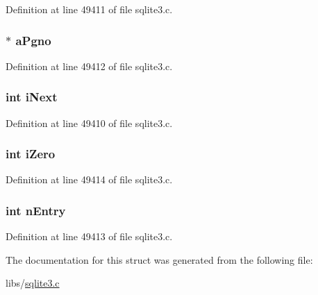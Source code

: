 Definition at line 49411 of file sqlite3.\+c.

\hypertarget{struct_wal_iterator_1_1_wal_segment_a7307f0b8f06bf14ab630326f96ea5410}{}
\subsubsection[{a\+Pgno}]{$\ast$ a\+Pgno}\label{struct_wal_iterator_1_1_wal_segment_a7307f0b8f06bf14ab630326f96ea5410}


Definition at line 49412 of file sqlite3.\+c.

\hypertarget{struct_wal_iterator_1_1_wal_segment_a7055b113747e55de4bbbf2e0acea4c9f}{}
\subsubsection[{i\+Next}]{\setlength{\rightskip}{0pt plus 5cm}int i\+Next}\label{struct_wal_iterator_1_1_wal_segment_a7055b113747e55de4bbbf2e0acea4c9f}


Definition at line 49410 of file sqlite3.\+c.

\hypertarget{struct_wal_iterator_1_1_wal_segment_ab7e86018ffe08ff695a3f7fe9f268de6}{}
\subsubsection[{i\+Zero}]{\setlength{\rightskip}{0pt plus 5cm}int i\+Zero}\label{struct_wal_iterator_1_1_wal_segment_ab7e86018ffe08ff695a3f7fe9f268de6}


Definition at line 49414 of file sqlite3.\+c.

\hypertarget{struct_wal_iterator_1_1_wal_segment_a9eea28d16cd908667d461e0e7e09fb53}{}
\subsubsection[{n\+Entry}]{\setlength{\rightskip}{0pt plus 5cm}int n\+Entry}\label{struct_wal_iterator_1_1_wal_segment_a9eea28d16cd908667d461e0e7e09fb53}


Definition at line 49413 of file sqlite3.\+c.



The documentation for this struct was generated from the following file\+:\begin{DoxyCompactItemize}
\item 
libs/\hyperlink{sqlite3_8c}{sqlite3.\+c}\end{DoxyCompactItemize}
